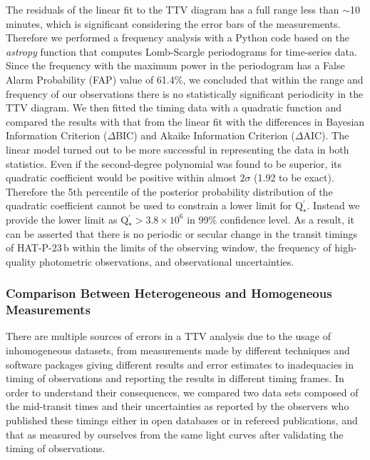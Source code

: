 \documentclass[a4paper,fleqn,usenatbib]{mnras}
\begin{document}
The residuals of the linear fit to the TTV diagram has a full range less than $\sim$10 minutes, which is significant considering the error bars of the measurements. Therefore we performed a frequency analysis with a Python code based on the \emph{astropy} function that computes Lomb-Scargle periodograms for time-series data. Since the frequency with the maximum power in the periodogram has a False Alarm Probability (FAP) value of 61.4\%, we concluded that within the range and frequency of our observations there is no statistically significant periodicity in the TTV diagram. We then fitted the timing data with a quadratic function and compared the results with that from the linear fit with the differences in Bayesian Information Criterion ($\Delta$BIC) and Akaike Information Criterion ($\Delta$AIC). The linear model turned out to be more successful in representing the data in both statistics. Even if the second-degree polynomial was found to be superior, its quadratic coefficient would be positive within almost $2\sigma$ (1.92 to be exact). Therefore the 5th percentile of the posterior probability distribution of the quadratic coefficient cannot be used to constrain a lower limit for Q$^{\prime}_{\star}$. Instead we provide the lower limit as Q$^{\prime}_{\star} > 3.8 \times 10^{6}$ in 99\% confidence level. As a result, it can be asserted that there is no periodic or secular change in the transit timings of HAT-P-23\,b within the limits of the observing window, the frequency of high-quality photometric observations, and observational uncertainties.

\subsubsection{Comparison Between Heterogeneous and Homogeneous Measurements}
\label{subsec:comparisons}
There are multiple sources of errors in a TTV analysis due to the usage of inhomogeneous datasets, from measurements made by different techniques and software packages giving different results and error estimates to inadequacies in timing of observations and reporting the results in different timing frames. In order to understand their consequences, we compared two data sets composed of the mid-transit times and their uncertainties as reported by the observers who published these timings either in open databases or in refereed publications, and that as measured by ourselves from the same light curves after validating the timing of observations.
\end{document}
